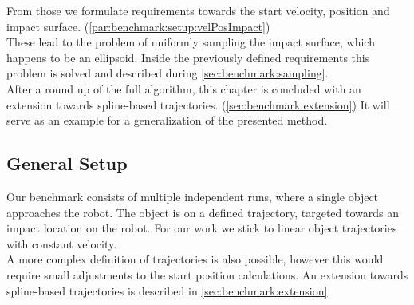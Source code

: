 From those we formulate requirements towards the start velocity, position and impact surface. (\cref{par:benchmark:setup:velPosImpact})
\\
These lead to the problem of uniformly sampling the impact surface, which happens to be an ellipsoid.
Inside the previously defined requirements this problem is solved and described during \cref{sec:benchmark:sampling}.
\\
After a round up of the full algorithm, this chapter is concluded with an extension towards spline-based trajectories. (\cref{sec:benchmark:extension})
It will serve as an example for a generalization of the presented method.

\subsection{General Setup} \label{sec:benchmark:setup}
Our benchmark consists of multiple independent runs, where a single object approaches the robot.
The object is on a defined trajectory, targeted towards an impact location on the robot.
For our work we stick to linear object trajectories with constant velocity.
\\
A more complex definition of trajectories is also possible, however this would require small adjustments to the start position calculations.
An extension towards spline-based trajectories is described in \cref{sec:benchmark:extension}.
